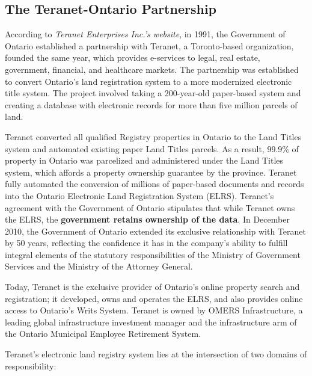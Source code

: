 \documentclass[11pt]{article}
\begin{document}
    \subsection{The Teranet-Ontario Partnership} \label{subsec:teranet_ontario}

    According to \textit{Teranet Enterprises Inc.'s website}\cite{TeranetEnterprisesInc.2019}, in 1991, the Government of Ontario established a partnership with Teranet, a Toronto-based organization, founded the same year, which provides e-services to legal, real estate, government, financial, and healthcare markets.
    The partnership was established to convert Ontario's land registration system to a more modernized electronic title system.
    The project involved taking a 200-year-old paper-based system and creating a database with electronic records for more than five million parcels of land.

    Teranet converted all qualified Registry properties in Ontario to the Land Titles system and automated existing paper Land Titles parcels.
    As a result, 99.9\% of property in Ontario was parcelized and administered under the Land Titles system, which affords a property ownership guarantee by the province.
    Teranet fully automated the conversion of millions of paper-based documents and records into the Ontario Electronic Land Registration System (ELRS).
    Teranet's agreement with the Government of Ontario stipulates that while Teranet owns the ELRS, the \textbf{government retains ownership of the data}.
    In December 2010, the Government of Ontario extended its exclusive relationship with Teranet by 50 years, reflecting the confidence it has in the company's ability to fulfill integral elements of the statutory responsibilities of the Ministry of Government Services and the Ministry of the Attorney General.

    Today, Teranet is the exclusive provider of Ontario's online property search and registration;
    it developed, owns and operates the ELRS, and also provides online access to Ontario's Writs System.
    Teranet is owned by OMERS Infrastructure, a leading global infrastructure investment manager and the infrastructure arm of the Ontario Municipal Employee Retirement System.

    \vspace{5mm}

    Teranet's electronic land registry system lies at the intersection of two domains of responsibility:

    \vspace{5mm}
\end{document}
